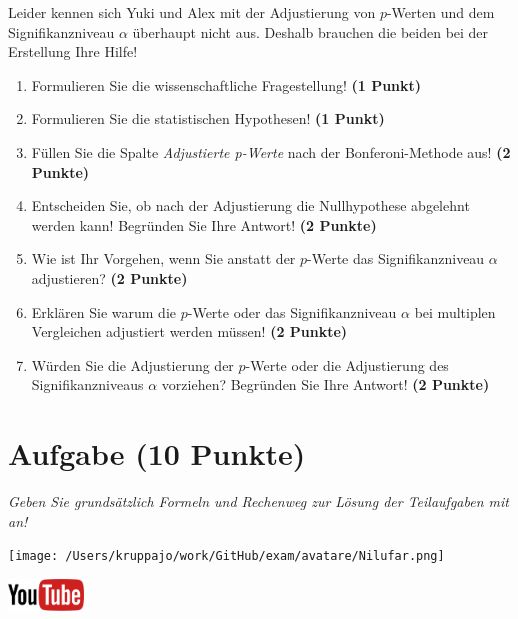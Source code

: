 \documentclass[a4paper, 9pt]{scrartcl}\usepackage[]{graphicx}\usepackage[]{xcolor}
\begin{document}
Leider kennen sich Yuki und Alex mit der Adjustierung von $p$-Werten und dem Signifikanzniveau $\alpha$ überhaupt nicht aus. Deshalb brauchen die beiden bei der Erstellung Ihre Hilfe!

\begin{enumerate}
  \item Formulieren Sie die wissenschaftliche Fragestellung! \textbf{(1 Punkt)}
  \item Formulieren Sie die statistischen Hypothesen! \textbf{(1 Punkt)}
\item Füllen Sie die Spalte \textit{Adjustierte p-Werte} nach der Bonferoni-Methode aus! \textbf{(2 Punkte)}
\item Entscheiden Sie, ob nach der Adjustierung die Nullhypothese abgelehnt werden kann! Begründen Sie Ihre Antwort! \textbf{(2 Punkte)}
\item Wie ist Ihr Vorgehen, wenn Sie anstatt der $p$-Werte das Signifikanzniveau $\alpha$ adjustieren? \textbf{(2 Punkte)}
\item Erklären Sie warum die $p$-Werte oder das Signifikanzniveau $\alpha$ bei multiplen Vergleichen adjustiert werden müssen! \textbf{(2 Punkte)}
\item Würden Sie die Adjustierung der $p$-Werte oder die Adjustierung des Signifikanzniveaus $\alpha$ vorziehen? Begründen Sie Ihre Antwort! \textbf{(2 Punkte)}
\end{enumerate}


 
\clearpage

\section{Aufgabe \hfill (10 Punkte)}

\textit{Geben Sie grundsätzlich Formeln und Rechenweg zur Lösung der Teilaufgaben mit an!} \\[1Ex]
 

 
\begin{minipage}[t]{0.5\textwidth}
\texttt{[image: /Users/kruppajo/work/GitHub/exam/avatare/Nilufar.png]}
\end{minipage}
\begin{minipage}[t]{0.5\textwidth}
\hfill
\href{https://youtu.be/xq29O8qDrg0}{\includegraphics[width = 2cm]{img/youtube}}
\end{minipage}
\vspace{1ex}
\end{document}
